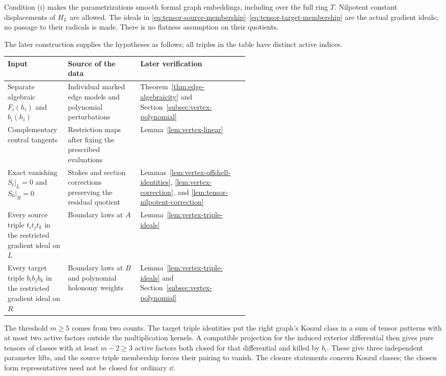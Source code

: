 Condition (i) makes the parametrizations smooth formal graph embeddings,
including over the full ring \(T\).  Nilpotent constant displacements of
\(H_L\) are allowed.  The ideals in
\eqref{eq:tensor-source-membership}--\eqref{eq:tensor-target-membership}
are the actual gradient ideals; no passage to their radicals is made.
There is no flatness assumption on their quotients.

The later construction supplies the hypotheses as follows; all triples
in the table have distinct active indices.
\begin{center}
\begin{tabular}{@{}
 >{\raggedright\arraybackslash}p{0.25\linewidth}
 >{\raggedright\arraybackslash}p{0.30\linewidth}
 >{\raggedright\arraybackslash}p{}
 @{}}
\toprule
Input & Source of the data & Later verification \\
\midrule
Separate algebraic \(F_i(h_i)\) and \(b_i(h_i)\)
 & Individual marked edge models and polynomial perturbations
 & Theorem~\ref{thm:edge-algebraicity} and
   Section~\ref{subsec:vertex-polynomial} \\[4pt]
Complementary central tangents
 & Restriction maps after fixing the prescribed evaluations
 & Lemma~\ref{lem:vertex-linear} \\[4pt]
Exact vanishing \(S_t|_L=0\) and \(S_0|_R=0\)
 & Stokes and section corrections preserving the residual quotient
 & Lemmas~\ref{lem:vertex-offshell-identities},
   \ref{lem:vertex-correction}, and
   \ref{lem:tensor-nilpotent-correction} \\[4pt]
Every source triple \(t_i t_j t_k\) in the restricted gradient ideal on \(L\)
 & Boundary laws at \(A\)
 & Lemma~\ref{lem:vertex-triple-ideals} \\[4pt]
Every target triple \(b_i b_j b_k\) in the restricted gradient ideal on \(R\)
 & Boundary laws at \(B\) and polynomial holonomy weights
 & Lemma~\ref{lem:vertex-triple-ideals} and
   Section~\ref{subsec:vertex-polynomial} \\
\bottomrule
\end{tabular}
\end{center}

The threshold \(m\geq5\) comes from two counts.  The target triple
identities put the right graph's Koszul class in a sum of tensor patterns
with at most two active factors outside the multiplication kernels.
A compatible projection for the induced exterior differential then gives
pure tensors of classes with at least \(m-2\geq3\) active factors both
closed for that differential and killed by \(b_i\).
These give three independent parameter lifts, and the source triple
membership forces their pairing to vanish.  The closure statements concern
Koszul classes; the chosen form representatives need not be closed for
ordinary \(\dd\).


